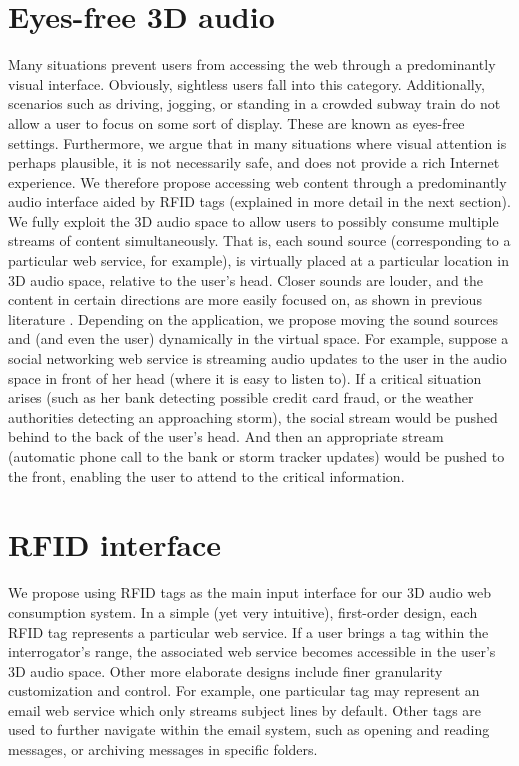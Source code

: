\documentclass[conference]{IEEEtran}
\begin{document}
\section{Eyes-free 3D audio}
Many situations prevent users from accessing the web through a predominantly visual interface.  Obviously, sightless users fall into this category.  Additionally, scenarios such as driving, jogging, or standing in a crowded subway train do not allow a user to focus on some sort of display.  These are known as eyes-free settings.  Furthermore, we argue that in many situations where visual attention is perhaps plausible, it is not necessarily safe, and does not provide a rich Internet experience.  We therefore propose accessing web content through a predominantly audio interface aided by RFID tags (explained in more detail in the next section).  We fully exploit the 3D audio space to allow users to possibly consume multiple streams of content simultaneously.  That is, each sound source (corresponding to a particular web service, for example), is virtually placed at a particular location in 3D audio space, relative to the user's head.  Closer sounds are louder, and the content in certain directions are more easily focused on, as shown in previous literature \cite{2009Vazquez-Alvarez}.  Depending on the application, we propose moving the sound sources and (and even the user) dynamically in the virtual space.  For example, suppose a social networking web service is streaming audio updates to the user in the audio space in front of her head (where it is easy to listen to).  If a critical situation arises (such as her bank detecting possible credit card fraud, or the weather authorities detecting an approaching storm), the social stream would be pushed behind to the back of the user's head.  And then an appropriate stream (automatic phone call to the bank or storm tracker updates) would be pushed to the front, enabling the user to attend to the critical information.

\section{RFID interface}
We propose using RFID tags as the main input interface for our 3D audio web consumption system.  In a simple (yet very intuitive), first-order design, each RFID tag represents a particular web service.  If a user brings a tag within the interrogator's range, the associated web service becomes accessible in the user's 3D audio space.  Other more elaborate designs include finer granularity customization and control.  For example, one particular tag may represent an email web service which only streams subject lines by default.  Other tags are used to further navigate within the email system, such as opening and reading messages, or archiving messages in specific folders.
\end{document}
